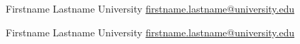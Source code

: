 
\begin{cventries}
    \cvreference
    {Firstname Lastname} %
    {} %
    {University} %
    {\href{mailto:firstname.lastname@university.edu}{firstname.lastname@university.edu}}%
    {}%
    \vspace{.5em}

    \cvreference
    {Firstname Lastname} %
    {} %
    {University} %
    {\href{mailto:firstname.lastname@university.edu}{firstname.lastname@university.edu}}%
    {}%
\end{cventries}
